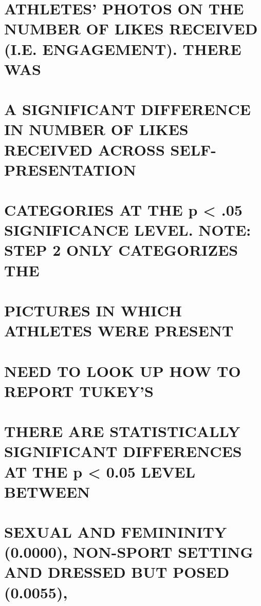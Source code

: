 \documentclass[
]{article}
\begin{document}
\hypertarget{athletes-photos-on-the-number-of-likes-received-i.e.-engagement.-there-was}{%
\section{ATHLETES' PHOTOS ON THE NUMBER OF LIKES RECEIVED (I.E.
ENGAGEMENT). THERE
WAS}\label{athletes-photos-on-the-number-of-likes-received-i.e.-engagement.-there-was}}

\hypertarget{a-significant-difference-in-number-of-likes-received-across-self-presentation}{%
\section{A SIGNIFICANT DIFFERENCE IN NUMBER OF LIKES RECEIVED ACROSS
SELF-PRESENTATION}\label{a-significant-difference-in-number-of-likes-received-across-self-presentation}}

\hypertarget{categories-at-the-p-.05-significance-level.-note-step-2-only-categorizes-the}{%
\section{CATEGORIES AT THE p \textless{} .05 SIGNIFICANCE LEVEL. NOTE:
STEP 2 ONLY CATEGORIZES
THE}\label{categories-at-the-p-.05-significance-level.-note-step-2-only-categorizes-the}}

\hypertarget{pictures-in-which-athletes-were-present}{%
\section{PICTURES IN WHICH ATHLETES WERE
PRESENT}\label{pictures-in-which-athletes-were-present}}

\hypertarget{need-to-look-up-how-to-report-tukeys}{%
\section{NEED TO LOOK UP HOW TO REPORT
TUKEY'S}\label{need-to-look-up-how-to-report-tukeys}}

\hypertarget{there-are-statistically-significant-differences-at-the-p-0.05-level-between}{%
\section{THERE ARE STATISTICALLY SIGNIFICANT DIFFERENCES AT THE p
\textless{} 0.05 LEVEL
BETWEEN}\label{there-are-statistically-significant-differences-at-the-p-0.05-level-between}}

\hypertarget{sexual-and-femininity-0.0000-non-sport-setting-and-dressed-but-posed-0.0055}{%
\section{SEXUAL AND FEMININITY (0.0000), NON-SPORT SETTING AND DRESSED
BUT POSED
(0.0055),}\label{sexual-and-femininity-0.0000-non-sport-setting-and-dressed-but-posed-0.0055}}
\end{document}
